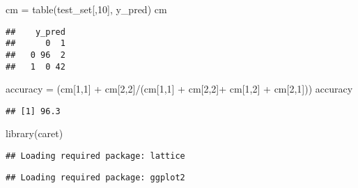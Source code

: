\documentclass[
]{article}
\newenvironment{Shaded}{\begin{snugshade}}{\end{snugshade}}
\newcommand{\DecValTok}[1]{\textcolor[rgb]{0.00,0.00,0.81}{#1}}
\newcommand{\FunctionTok}[1]{\textcolor[rgb]{0.00,0.00,0.00}{#1}}
\newcommand{\NormalTok}[1]{#1}
\newcommand{\OtherTok}[1]{\textcolor[rgb]{0.56,0.35,0.01}{#1}}
\newcommand{\SpecialCharTok}[1]{\textcolor[rgb]{0.00,0.00,0.00}{#1}}
\begin{document}
\begin{Shaded}
\begin{Highlighting}[]
\NormalTok{cm }\OtherTok{=} \FunctionTok{table}\NormalTok{(test\_set[,}\DecValTok{10}\NormalTok{], y\_pred)}
\NormalTok{cm}
\end{Highlighting}
\end{Shaded}

\begin{verbatim}
##    y_pred
##      0  1
##   0 96  2
##   1  0 42
\end{verbatim}

\begin{Shaded}
\begin{Highlighting}[]
\NormalTok{accuracy }\OtherTok{=}\NormalTok{ (cm[}\DecValTok{1}\NormalTok{,}\DecValTok{1}\NormalTok{] }\SpecialCharTok{+}\NormalTok{ cm[}\DecValTok{2}\NormalTok{,}\DecValTok{2}\NormalTok{]}\SpecialCharTok{/}\NormalTok{(cm[}\DecValTok{1}\NormalTok{,}\DecValTok{1}\NormalTok{] }\SpecialCharTok{+}\NormalTok{ cm[}\DecValTok{2}\NormalTok{,}\DecValTok{2}\NormalTok{]}\SpecialCharTok{+}\NormalTok{ cm[}\DecValTok{1}\NormalTok{,}\DecValTok{2}\NormalTok{] }\SpecialCharTok{+}\NormalTok{ cm[}\DecValTok{2}\NormalTok{,}\DecValTok{1}\NormalTok{]))}
\NormalTok{accuracy}
\end{Highlighting}
\end{Shaded}

\begin{verbatim}
## [1] 96.3
\end{verbatim}

\begin{Shaded}
\begin{Highlighting}[]
\FunctionTok{library}\NormalTok{(caret)}
\end{Highlighting}
\end{Shaded}

\begin{verbatim}
## Loading required package: lattice
\end{verbatim}

\begin{verbatim}
## Loading required package: ggplot2
\end{verbatim}
\end{document}
